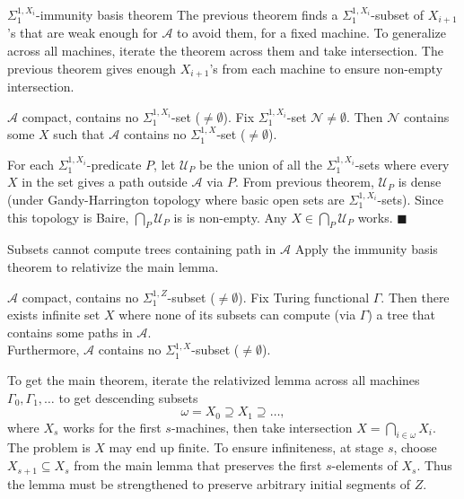 \begin{frame}{$\Sigma_1^{1,X_i}$-immunity basis theorem}
  The previous theorem finds a $\Sigma_1^{1,X_i}$-subset of $X_{i+1}$'s
  that are weak enough for $\mathcal{A}$ to avoid them, for a fixed
  machine. To generalize across all machines, iterate the theorem across
  them and take intersection. The previous theorem gives enough
  $X_{i+1}$'s from each machine to ensure non-empty intersection.

  \vspace{1em}
  \begin{immunity*}
    $\mathcal{A}$ compact, contains no $\Sigma_1^{1,X_i}$-set
    ($\neq\emptyset$). Fix $\Sigma_1^{1,X_i}$-set
    $\mathcal{N}\neq\emptyset$. Then $\mathcal{N}$ contains some $X$ such
    that $\mathcal{A}$ contains no $\Sigma_1^{1,X}$-set ($\neq\emptyset$).
  \end{immunity*}

  \vspace{1em}
  For each $\Sigma_1^{1,X_i}$-predicate $P$, let $\mathcal{U}_P$ be the
  union of all the $\Sigma_1^{1,X_i}$-sets where every $X$ in the set gives
  a path outside $\mathcal{A}$ via $P$. From previous theorem,
  $\mathcal{U}_P$ is dense (under Gandy-Harrington topology where basic
  open sets are $\Sigma_1^{1,X_i}$-sets). Since this topology is Baire,
  $\bigcap_P\mathcal{U}_P$ is is non-empty. Any
  $X\in\bigcap_P\mathcal{U}_P$ works. $\blacksquare$
\end{frame}

\begin{frame}{Subsets cannot compute trees containing path in $\mathcal{A}$}
  Apply the immunity basis theorem to relativize the main lemma.
  \begin{main-lemma*}[Relativized]
    $\mathcal{A}$ compact, contains no $\Sigma_1^{1,Z}$-subset
    ($\neq\emptyset$). Fix Turing functional $\Gamma$. Then there exists
    infinite set $X$ where none of its subsets can compute (via $\Gamma$) a
    tree that contains some paths in $\mathcal{A}$.\\
    \vspace{0.5em}
    Furthermore, $\mathcal{A}$ contains no $\Sigma_1^{1,X}$-subset
    ($\neq\emptyset$).
  \end{main-lemma*}

  To get the main theorem, iterate the relativized lemma across all
  machines $\Gamma_0,\Gamma_1,\ldots$ to get descending subsets
  \[\omega=X_0\supseteq X_1\supseteq\ldots,\]
  where $X_s$ works for the first $s$-machines, then take intersection
  $X=\bigcap_{i\in\omega} X_i$. The problem is $X$ may end up finite. To
  ensure infiniteness, at stage $s$, choose $X_{s+1}\subseteq X_s$ from the
  main lemma that preserves the first $s$-elements of $X_s$. Thus the lemma
  must be strengthened to preserve arbitrary initial segments of $Z$.
\end{frame}

